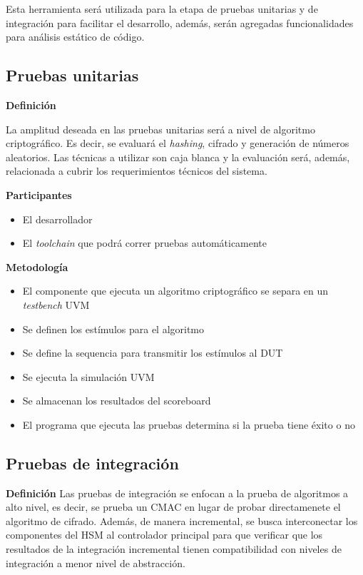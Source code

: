 \documentclass[a4paper]{article}
\begin{document}
Esta herramienta será utilizada para la etapa de pruebas unitarias y de integración para facilitar el desarrollo, además, serán agregadas funcionalidades para análisis estático de código.

\newpage
\subsection{Pruebas unitarias}

\noindent \textbf{Definición}

La amplitud deseada en las pruebas unitarias será a nivel de algoritmo criptográfico. Es decir, se evaluará el \textit{hashing}, cifrado y generación de números aleatorios. Las técnicas a utilizar son caja blanca y la evaluación será, además, relacionada a cubrir los requerimientos técnicos del sistema. 

\noindent\textbf{Participantes}

\begin{itemize}
  \item El desarrollador
  \item El \textit{toolchain} que podrá correr pruebas automáticamente
\end{itemize}


\noindent\textbf{Metodología}

\begin{itemize}
  \item El componente que ejecuta un algoritmo criptográfico se separa en un \textit{testbench} UVM
  \item Se definen los estímulos para el algoritmo
  \item Se define la sequencia para transmitir los estímulos al DUT
  \item Se ejecuta la simulación UVM
  \item Se almacenan los resultados del scoreboard
  \item El programa que ejecuta las pruebas determina si la prueba tiene éxito o no
\end{itemize}


\subsection{Pruebas de integración}

\noindent\textbf{Definición}
Las pruebas de integración se enfocan a la prueba de algoritmos a alto nivel, es decir, se prueba un CMAC en lugar de probar directamenete el algoritmo de cifrado. Además, de manera incremental, se busca interconectar los componentes del HSM al controlador principal para que verificar que los resultados de la integración incremental tienen compatibilidad con niveles de integración a menor nivel de abstracción.
\end{document}
